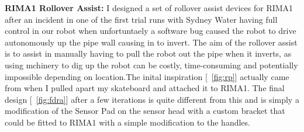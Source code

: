 
\newpage
\textbf{RIMA1 Rollover Assist:} I designed a set of rollover assist devices for RIMA1 after an incident in one of the first trial runs with Sydney Water having full control in our robot when unfortuntaely
a software bug caused the robot to drive autonomously up the pipe wall causing in to invert. The aim of the rollover assist is to assist in manually having to pull the robot out the pipe when it inverts, as 
using mchinery to dig up the robot can be costly, time-consuming and potentially impossible depending on location.The inital inspiration [~\ref{fig:rp}] actually came from when I pulled apart my skateboard and attached it to RIMA1.
The final design [~\ref{fig:fdra}] after a few iterations is quite different from this and is simply a modification of the Sensor Pad on the sensor head with a custom bracket that could be fitted to RIMA1 with a simple modification to the handles.  


